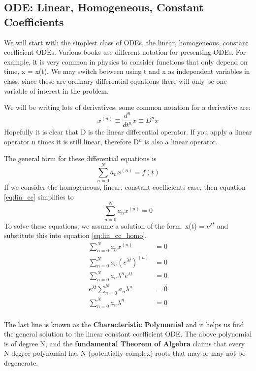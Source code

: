 \documentclass{article}
\newcommand{\be}{\begin{equation}}
\newcommand{\ee}{\end{equation}}
\begin{document}
\subsection*{ODE: Linear, Homogeneous, Constant Coefficients}
We will start with the simplest class of ODEs, the linear, homogeneous, constant coefficient ODEs.
Various books use different notation for presenting ODEs.
For example, it is very common in physics to consider functions that only depend on time, x = x(t).
We may switch between using t and x as independent variables in class, since these are ordinary differential equations there will only be one variable of interest in the problem.

We will be writing lots of derivatives, some common notation for a derivative are:
\be
x^{(n)} \equiv \frac{d^n}{dt^n}x \equiv D^n x
\ee
Hopefully it is clear that D is the linear differential operator.
If you apply a linear operator n times it is still linear, therefore D$^n$ is also a linear operator.

The general form for these differential equations is
\be \label{eq:lin_cc}
\sum_{n=0}^N a_nx^{(n)} = f(t)
\ee
If we consider the homogeneous, linear, constant coefficients case, then equation \ref{eq:lin_cc} simplifies to
\be \label{eq:lin_cc_homo}
\sum_{n=0}^N a_nx^{(n)} = 0
\ee
To solve these equations, we assume a solution of the form: x(t) = e$^{\lambda t}$ and substitute this into equation \ref{eq:lin_cc_homo}.
\be
\begin{split}
    \sum_{n=0}^N a_nx^{(n)} &= 0\\
    \sum_{n=0}^N a_n \left(e^{\lambda t}\right) ^{(n)} &= 0\\
    \sum_{n=0}^N a_n \lambda^n e^{\lambda t} &= 0\\
    e^{\lambda t} \sum_{n=0}^N a_n \lambda^n &= 0\\
    \sum_{n=0}^N a_n \lambda^n &= 0\\
\end{split}
\ee

The last line is known as the \textbf{Characteristic Polynomial} and it helps us find the general solution to the linear constant coefficient ODE.
The above polynomial is of degree N, and the \textbf{fundamental Theorem of Algebra} claims that every N degree polynomial has N (potentially complex) roots that may or may not be degenerate.
\end{document}

